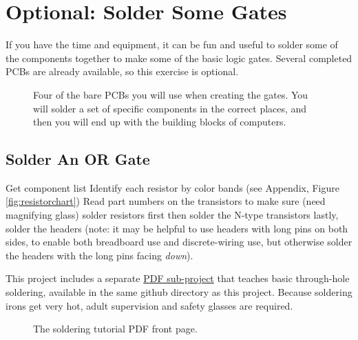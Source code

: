 \section{Optional: Solder Some Gates}

If you have the time and equipment, it can be fun and useful to solder some of the components together to make some of the basic logic gates. Several completed PCBs are already available, so this exercise is optional. %

\begin{figure}[h!]
\begin{center}
\end{center}
\caption{Four of the bare PCBs you will use when creating the gates. You will solder a set of specific components in the correct places, and then you will end up with the building blocks of computers.}
\label{fig:barepcbs}
\end{figure}

\subsection*{Solder An OR Gate}

\bi

\+ Get component list 
\+ Identify each resistor by color bands (see Appendix, Figure \ref{fig:resistorchart})
\+ Read part numbers on the transistors to make sure (need magnifying glass)
\+ solder resistors first
\+ then solder the N-type transistors 
\+ lastly, solder the headers (note: it may be helpful to use headers with long pins on both sides, to enable both breadboard use and discrete-wiring use, but otherwise solder the headers with the long pins facing \emph{down}).

\ei

This project includes a separate {\color{webblue}\href{https://github.com/jessehamner/TechMillForKids/tree/master/soldering}{PDF sub-project}} that teaches basic through-hole soldering, available in the same github directory as this project. Because soldering irons get very hot, adult supervision and safety glasses are required.

\begin{figure}[h!]
\begin{center}
\end{center}
\caption{The soldering tutorial PDF front page.}
\label{fig:soldering}
\end{figure}

